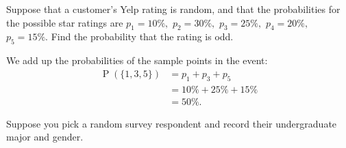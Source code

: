 \documentclass[11pt]{exam}
\DeclareMathOperator*{\Prob}{P}
\renewcommand{\Pr}{\Prob}
\begin{document}
\begin{questions}
\question Suppose that a customer's Yelp rating is random, and that the
probabilities for the possible star ratings are
\(
  p_1 = 10\%,
\)
\(
  p_2 = 30\%,
\)
\(
  p_3 = 25\%,
\)
\(
  p_4 = 20\%,
\)
\(
  p_5 = 15\%.
\)
Find the probability that the rating is odd.

\begin{solution}
We add up the probabilities of the sample points in the event:
\begin{align*}
  \Pr(\{1, 3, 5\})
    &= p_1 + p_3 + p_5 \\
    &= 10\% + 25\% + 15\% \\
    &= 50\%.
\end{align*}
\end{solution}



\newpage




\question Suppose you pick a random survey respondent and record their
undergraduate major and gender.  

\end{questions}
\end{document}
